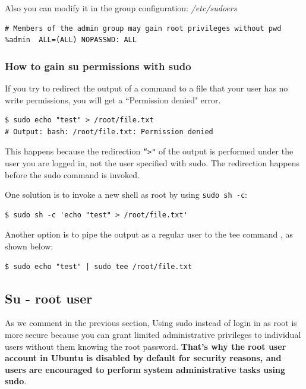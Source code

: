 \documentclass{article}
\newenvironment{codetemplate}[1][]{%
  \mybasecolorbox[#1]
  \itshape
}{%
  \endmybasecolorbox
}
\begin{document}
Also you can modify it in the group configuration:
\begin{codetemplate}{/etc/sudoers}
\begin{verbatim}
# Members of the admin group may gain root privileges without pwd
%admin  ALL=(ALL) NOPASSWD: ALL
\end{verbatim}
\end{codetemplate}

\subsubsection{How to gain su permissions with sudo}
If you try to redirect the output of a command to a file that your user has no write permissions, you will get a “Permission denied" error.
\begin{codetemplate}{}
\begin{verbatim}
$ sudo echo "test" > /root/file.txt
# Output: bash: /root/file.txt: Permission denied
\end{verbatim}
\end{codetemplate}

This happens because the redirection \verb|“>"| of the output is performed under the user you are logged in, not the user specified with sudo. The redirection happens before the sudo command is invoked.

One solution is to invoke a new shell as root by using \verb|sudo sh -c|:

\begin{codetemplate}{}
\begin{verbatim}
$ sudo sh -c 'echo "test" > /root/file.txt'
\end{verbatim}
\end{codetemplate}

Another option is to pipe the output as a regular user to the tee command , as shown below:

\begin{codetemplate}{}
\begin{verbatim}
$ sudo echo "test" | sudo tee /root/file.txt
\end{verbatim}
\end{codetemplate}

\subsection{Su - root user}

As we comment in the previous section, Using sudo instead of login in as root is more secure because you can grant limited administrative privileges to individual users without them knowing the root password. \textbf{That's why the root user account in Ubuntu is disabled by default for security reasons, and users are encouraged to perform system administrative tasks using sudo}.
\end{document}
